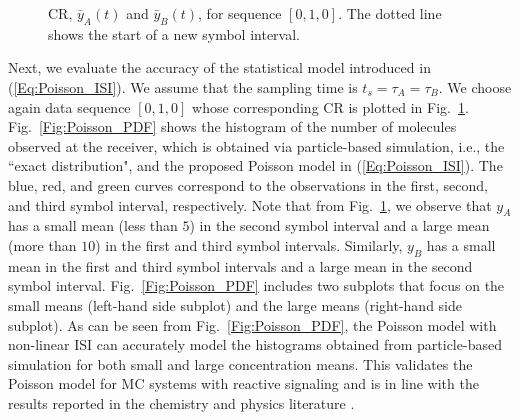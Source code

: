 \documentclass[conference]{IEEEtran}
\begin{document}
\begin{figure} 
  \centering\vspace{-0.1cm}
\hspace{-0.6cm}
 \vspace{-0.4cm}
\caption{CR, $\bar{y}_A(t)$ and $\bar{y}_B(t)$, for sequence $[0,1,0]$. The dotted line shows the start of a new symbol interval. \vspace{-0.5cm} }
\label{Fig:CR_nonLinear}
\end{figure}


Next, we evaluate the accuracy of the statistical model introduced in (\ref{Eq:Poisson_ISI}). We assume that the sampling time is $t_s=\tau_A=\tau_B$. We choose  again data sequence $[0,1,0]$ whose corresponding CR is plotted in Fig.~\ref{Fig:CR_nonLinear}.  Fig.~\ref{Fig:Poisson_PDF} shows  the histogram of the number of molecules observed at the receiver, which is obtained via particle-based simulation, i.e., the ``exact distribution", and the proposed Poisson model in (\ref{Eq:Poisson_ISI}). The blue, red, and green curves correspond to the observations in the first, second, and third symbol interval, respectively. Note that from Fig.~\ref{Fig:CR_nonLinear}, we observe that $y_A$ has a small mean (less than $5$) in the second symbol interval and a large mean (more than $10$) in the first and third symbol intervals. Similarly,  $y_B$ has a small mean in the first and third symbol intervals and a large mean in the second symbol interval.   Fig.~\ref{Fig:Poisson_PDF} includes two subplots that focus on the small means (left-hand side subplot) and the large means (right-hand side subplot). As can be seen from Fig.~\ref{Fig:Poisson_PDF}, the Poisson model with non-linear ISI can accurately model the histograms obtained from particle-based simulation for both small and large concentration means. This validates the Poisson model for MC systems with reactive signaling and is in line with the results reported in the chemistry and physics literature \cite{PoissonGardiner,CoxNatureCommun}. 
\end{document}
